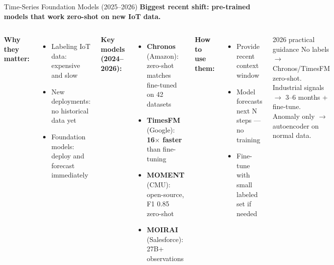 \documentclass[aspectratio=169,11pt]{beamer}
\begin{document}
\begin{frame}{Time-Series Foundation Models (2025--2026)}
    \small
    \textbf{Biggest recent shift: pre-trained models that work zero-shot on new IoT data.}

    \vspace{0.05cm}
    \begin{columns}
        \textbf{Why they matter:}
        \begin{itemize}\setlength{\itemsep}{0pt}
            \item Labeling IoT data: expensive and slow
            \item New deployments: no historical data yet
            \item Foundation models: deploy and forecast immediately
        \end{itemize}

        \vspace{0.05cm}
        \textbf{Key models (2024--2026):}
        \begin{itemize}\setlength{\itemsep}{0pt}
            \item \textbf{Chronos} (Amazon): zero-shot matches fine-tuned on 42 datasets
            \item \textbf{TimesFM} (Google): \textbf{16$\times$ faster} than fine-tuning
            \item \textbf{MOMENT} (CMU): open-source, F1 0.85 zero-shot
            \item \textbf{MOIRAI} (Salesforce): 27B+ observations
        \end{itemize}

        \textbf{How to use them:}
        \begin{itemize}\setlength{\itemsep}{0pt}
            \item Provide recent context window
            \item Model forecasts next N steps --- no training
            \item Fine-tune with small labeled set if needed
        \end{itemize}

        \vspace{0.05cm}
        \begin{alertblock}{2026 practical guidance}
            No labels $\rightarrow$ Chronos/TimesFM zero-shot.\\Industrial signals $\rightarrow$ 3--6 months + fine-tune.\\Anomaly only $\rightarrow$ autoencoder on normal data.
        \end{alertblock}
    \end{columns}
\end{frame}
\end{document}
